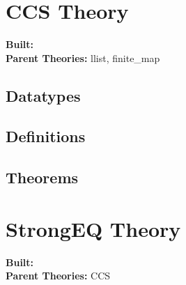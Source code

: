 \documentclass[11pt, twoside]{article}
\begin{document}














\tableofcontents
\cleardoublepage
\HOLpagestyle

\section{CCS Theory}
\begin{flushleft}
\textbf{Built:} \HOLCCSDate \\[2pt]
\textbf{Parent Theories:} llist, finite_map
\end{flushleft}

\subsection{Datatypes}

\HOLCCSDatatypes

\subsection{Definitions}

\HOLCCSDefinitions

\subsection{Theorems}

\HOLCCSTheorems

\section{StrongEQ Theory}
\begin{flushleft}
\textbf{Built:} \HOLStrongEQDate \\[2pt]
\textbf{Parent Theories:} CCS
\end{flushleft}
\end{document}
